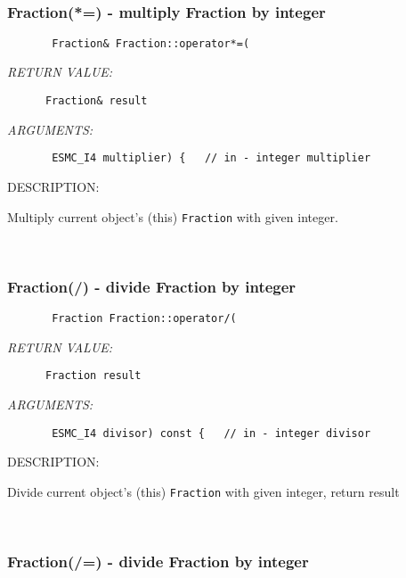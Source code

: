 \mbox{}\hrulefill\ 
 
\subsubsection [Fraction(*=)] {Fraction(*=) - multiply Fraction by integer}


  
\begin{verbatim}       Fraction& Fraction::operator*=(\end{verbatim}{\em RETURN VALUE:}
\begin{verbatim}      Fraction& result\end{verbatim}{\em ARGUMENTS:}
\begin{verbatim}       ESMC_I4 multiplier) {   // in - integer multiplier\end{verbatim}
{\sf DESCRIPTION:\\ }


        Multiply current object's (this) {\tt Fraction} with given
        integer. 
 
\mbox{}\hrulefill\ 
 
\subsubsection [Fraction(/)] {Fraction(/) - divide Fraction by integer}


  
\begin{verbatim}       Fraction Fraction::operator/(\end{verbatim}{\em RETURN VALUE:}
\begin{verbatim}      Fraction result\end{verbatim}{\em ARGUMENTS:}
\begin{verbatim}       ESMC_I4 divisor) const {   // in - integer divisor\end{verbatim}
{\sf DESCRIPTION:\\ }


        Divide current object's (this) {\tt Fraction} with given
        integer, return result
   
 
\mbox{}\hrulefill\ 
 
\subsubsection [Fraction(/=)] {Fraction(/=) - divide Fraction by integer}



